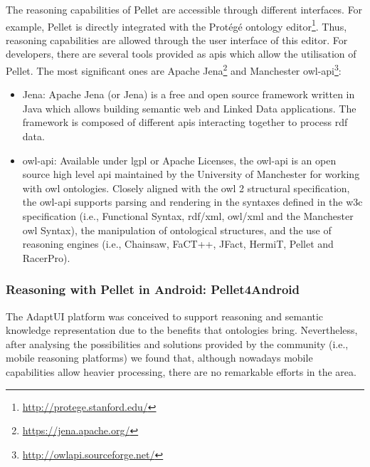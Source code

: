 The reasoning capabilities of Pellet are accessible through different interfaces.
For example, Pellet is directly integrated with the Protégé ontology 
editor\footnote{\url{http://protege.stanford.edu/}}. Thus, reasoning capabilities
are allowed through the user interface of this editor. For developers, there are
several tools provided as \acsp{api} which allow the utilisation of Pellet. The
most significant ones are Apache Jena\footnote{\url{https://jena.apache.org/}}
and Manchester \ac{owl}-\ac{api}\footnote{\url{http://owlapi.sourceforge.net/}}:

\begin{itemize}
  \item Jena: Apache Jena (or Jena) is a free and open source framework written
  in Java which allows building semantic web and Linked Data applications. The
  framework is composed of different \acp{api} interacting together to process 
  \ac{rdf} data.
  
  \item \ac{owl}-\ac{api}: Available under \ac{lgpl} or Apache Licenses, the 
  \ac{owl}-\ac{api} is an open source high level \ac{api} maintained by the 
  University of Manchester for working with \ac{owl} ontologies. Closely aligned 
  with the \ac{owl} 2 structural specification, the \ac{owl}-\ac{api} supports 
  parsing and rendering in the syntaxes defined in the \ac{w3c} specification 
  (i.e., Functional Syntax, \ac{rdf}/\ac{xml}, \ac{owl}/\ac{xml} and the 
  Manchester \ac{owl} Syntax), the manipulation of ontological structures, and 
  the use of reasoning engines (i.e., Chainsaw, FaCT++, JFact, HermiT, Pellet 
  and RacerPro).  
\end{itemize}



\subsubsection{Reasoning with Pellet in Android: Pellet4Android}
\label{sec:pellet4android}

The AdaptUI platform was conceived to support reasoning and semantic knowledge
representation due to the benefits that ontologies bring. Nevertheless, after
analysing the possibilities and solutions provided by the community (i.e., mobile
reasoning platforms) we found that, although nowadays mobile capabilities allow
heavier processing, there are no remarkable efforts in the area.


